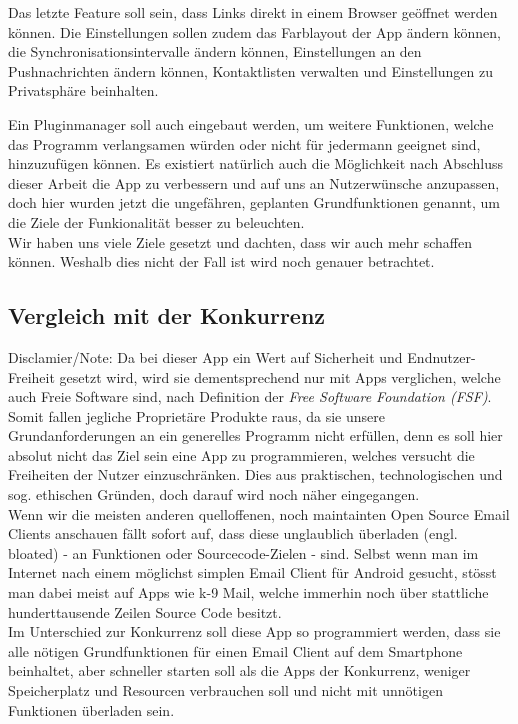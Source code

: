 \documentclass[a4paper,11pt]{article}
\begin{document}
Das letzte Feature soll sein, dass Links direkt in einem Browser geöffnet werden können. Die Einstellungen sollen zudem das Farblayout der App ändern können, die Synchronisationsintervalle ändern können, Einstellungen an den Pushnachrichten ändern können, Kontaktlisten verwalten und Einstellungen zu Privatsphäre beinhalten.

Ein Pluginmanager soll auch eingebaut werden, um weitere Funktionen, welche das Programm verlangsamen würden oder nicht für jedermann geeignet sind, hinzuzufügen können. Es existiert natürlich auch die Möglichkeit nach Abschluss dieser Arbeit die App zu verbessern und auf uns an Nutzerwünsche anzupassen, doch hier wurden jetzt die ungefähren, geplanten Grundfunktionen genannt, um die Ziele der Funkionalität besser zu beleuchten.\\

Wir haben uns viele Ziele gesetzt und dachten, dass wir auch mehr schaffen können. Weshalb dies nicht der Fall ist wird noch genauer betrachtet. 



\subsection{Vergleich mit der Konkurrenz}
Disclamier/Note: Da bei dieser App ein Wert auf Sicherheit und Endnutzer-Freiheit gesetzt wird, wird sie dementsprechend nur mit Apps verglichen, welche auch Freie Software sind, nach Definition der \textit{Free Software Foundation (FSF)}. Somit fallen jegliche Proprietäre Produkte raus, da sie unsere Grundanforderungen an ein generelles Programm nicht erfüllen, denn es soll hier absolut nicht das Ziel sein eine App zu programmieren, welches versucht die Freiheiten der Nutzer einzuschränken. Dies aus praktischen, technologischen und sog. ethischen Gründen, doch darauf wird noch näher eingegangen.\\

Wenn wir die meisten anderen quelloffenen, noch maintainten Open Source Email Clients anschauen fällt sofort auf, dass diese unglaublich überladen (engl. bloated) - an Funktionen oder Sourcecode-Zielen - sind. Selbst wenn man im Internet nach einem möglichst simplen Email Client für Android gesucht, stösst man dabei meist auf Apps wie k-9 Mail, welche immerhin noch über stattliche hunderttausende Zeilen Source Code besitzt.\\

Im Unterschied zur Konkurrenz soll diese App so programmiert werden, dass sie alle nötigen Grundfunktionen für einen Email Client auf dem Smartphone beinhaltet, aber schneller starten soll als die Apps der Konkurrenz, weniger Speicherplatz und Resourcen verbrauchen soll und nicht mit unnötigen Funktionen überladen sein.
\end{document}
